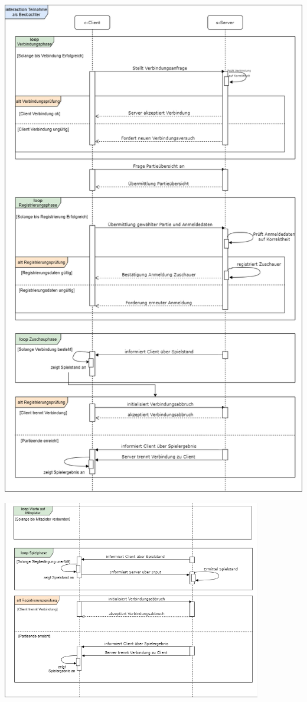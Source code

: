 \documentclass[12pt]{article}
\begin{document}
\begin{center}
\includegraphics[width=\textwidth]{images/Teilnahme_als_Beobachter}
\end{center}

\begin{center}
\includegraphics[width=0.85\textwidth]{images/Teilnahme_als_Spieler}
\end{center}
\end{document}
